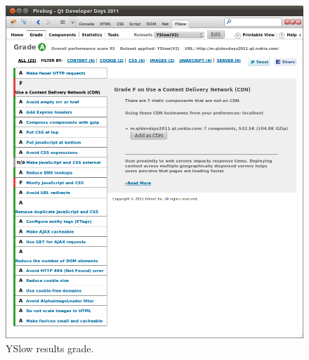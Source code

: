 \begin{figure}[ht]
  \begin{center}
    \includegraphics[width=\textwidth]{images/yslow-v2-grade.png}
    \caption{YSlow results grade.}
    \label{figure:yslow-v2-grade.png}
  \end{center}
\end{figure}

